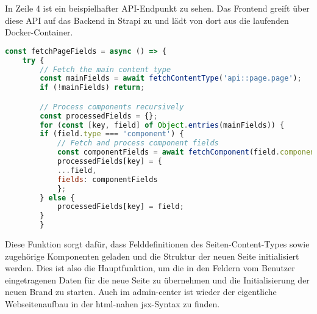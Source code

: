 In Zeile 4 ist ein beispielhafter API-Endpunkt zu sehen. Das Frontend greift über diese API auf das Backend in Strapi zu und lädt von dort aus die laufenden Docker-Container. 

\begin{lstlisting}[language=JavaScript, caption={fetchPageFields-Funktion}, label={lst:admincenterjsxFetchPageFieldsFunktion}]
const fetchPageFields = async () => {
    try {
        // Fetch the main content type
        const mainFields = await fetchContentType('api::page.page');
        if (!mainFields) return;

        // Process components recursively
        const processedFields = {};
        for (const [key, field] of Object.entries(mainFields)) {
        if (field.type === 'component') {
            // Fetch and process component fields
            const componentFields = await fetchComponent(field.component);
            processedFields[key] = {
            ...field,
            fields: componentFields
            };
        } else {
            processedFields[key] = field;
        }
        }
\end{lstlisting}

Diese Funktion sorgt dafür, dass Felddefinitionen des Seiten-Content-Types sowie zugehörige Komponenten geladen und die Struktur der neuen Seite initialisiert werden. Dies ist also die Hauptfunktion, um die in den Feldern vom Benutzer eingetragenen Daten für die neue Seite zu übernehmen und die Initialisierung der neuen Brand zu starten.
Auch im admin-center ist wieder der eigentliche Webseitenaufbau in der html-nahen jsx-Syntax zu finden.

